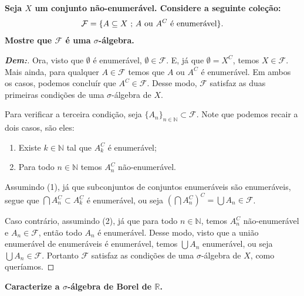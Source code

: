\localtableofcontents
{}
\bigline
\textbf{Seja $X$ um conjunto não-enumerável. Considere a seguinte coleção:
$$\mathcal F = 
\{A \subseteq X \text{ ; }  A \text{ ou } A^C \text{ é enumerável}\}.$$ 
  Mostre que $\mathcal F$ é uma $\sigma$-álgebra.}
\begin{proof}[\textbf{Dem:}]
 Ora, visto que $\emptyset$ é enumerável, $\emptyset \in \mathcal F$. 
E, já que $\emptyset = X^C$, temos $X \in \mathcal F$. Mais ainda,
para qualquer $A \in \mathcal F$ temos que $A$ ou $A^C$ é enumerável. 
Em ambos os casos, podemos concluír que $A^C \in \mathcal F$. Desse modo, $\mathcal F$ 
satisfaz as duas primeiras condições de uma $\sigma$-álgebra de $X$.

Para verificar a terceira condição, seja 
$\{A_n\}_{n \in \mathbb N} \subset \mathcal F$. Note que 
podemos recair a dois casos, são eles:
\begin{enumerate}
  \item Existe $k \in \mathbb N$ tal que $A_k^C$ é enumerável;
  \item Para todo $n \in \mathbb N$ temos $A_n^C$ não-enumerável. 
\end{enumerate}

Assumindo (1), já que subconjuntos de conjuntos enumeráveis são 
enumeráveis, segue que $\bigcap A_n^C \subset A_k^C$ é enumerável, ou seja 
$\left(\bigcap A_n^C\right)^C = \bigcup A_n \in \mathcal F$. 

Caso contrário, assumindo (2), já que para todo $n \in \mathbb N$, 
temos $A_n^C$ não-enumerável e $A_n \in \mathcal F$, então todo $A_n$ é enumerável.
Desse modo, visto que a união enumerável de enumeráveis é enumerável, temos 
$\bigcup A_n$ enumerável, ou seja $\bigcup A_n \in \mathcal F$. Portanto 
$\mathcal F$ satisfaz as condições de uma $\sigma$-álgebra de $X$, 
como queríamos. 
\end{proof}
\biglinend
\newpage
{}
\bigline
\textbf{Caracterize a $\sigma$-álgebra de Borel de $\mathbb R$.}
\noindent\textbf{} 
